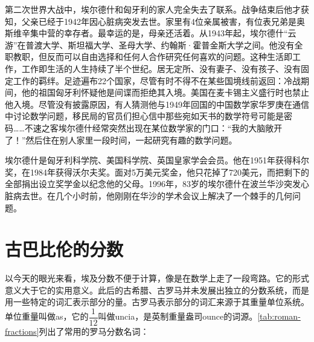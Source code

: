 \documentclass[b5paper]{ctexart}
\begin{document}
\begin{mdframed}
第二次世界大战中，埃尔德什和匈牙利的家人完全失去了联系。战争结束后他才获知，父亲已经于1942年因心脏病突发去世。家里有4位亲属被害，有位表兄弟是奥斯维辛集中营的幸存者。最幸运的是，母亲还活着。从1943年起，埃尔德什“云游”在普渡大学、斯坦福大学、圣母大学、约翰斯·霍普金斯大学之间。他没有全职教职，但反而可以自由选择和任何人合作研究任何喜欢的问题。这种生活即工作，工作即生活的人生持续了半个世纪。居无定所、没有妻子、没有孩子、没有固定工作的羁绊。足迹遍布22个国家，尽管有时不得不在某些国境线前返回：冷战期间，他的祖国匈牙利怀疑他是间谍而拒绝其入境。美国在麦卡锡主义盛行时也禁止他入境。尽管没有披露原因，有人猜测他与1949年回国的中国数学家华罗庚在通信中讨论数学问题，移民局的官员们担心信中那些宛如天书的数学符号可能是密码……\cite{MacTutor-Erdos-2000}不速之客埃尔德什经常突然出现在某位数学家的门口：“我的大脑敞开了！”然后住在别人家里一段时间，一起研究有趣的数学问题。

埃尔德什是匈牙利科学院、美国科学院、英国皇家学会会员。他在1951年获得科尔奖，在1984年获得沃尔夫奖。面对5万美元奖金，他只花掉了720美元，而把剩下的全部捐出设立奖学金以纪念他的父母。1996年，83岁的埃尔德什在波兰华沙突发心脏病去世。在几个小时前，他刚刚在华沙的学术会议上解决了一个棘手的几何问题。

\end{mdframed}

\section{古巴比伦的分数}
以今天的眼光来看，埃及分数不便于计算，像是在数学上走了一段弯路。它的形式意义大于它的实用意义。此后的古希腊、古罗马并未发展出独立的分数系统，而是用一些特定的词汇表示部分的量。古罗马表示部分的词汇来源于其重量单位系统。单位重量叫做as，它的$\dfrac{1}{12}$叫做uncia，是英制重量盎司ounce的词源。\cref{tab:roman-fractions}列出了常用的罗马分数名词\cite{Miller-2025}：
\end{document}
